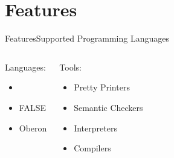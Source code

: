 






\section{Features}

\begin{frame}{Features}{Supported Programming Languages}
\begin{center}
\cpplogo{2em}
\fallogo{2em}
\oblogo{4em}
\end{center}
\begin{columns}[T]
\column{9em}
\begin{block}{Languages:}
\begin{itemize}
\item \cpp{}
\item FALSE
\item Oberon
\end{itemize}
\end{block}
\column{9em}
\begin{block}{Tools:}
\begin{itemize}
\item Pretty Printers
\item Semantic Checkers
\item Interpreters
\item Compilers
\end{itemize}
\end{block}
\end{columns}
\end{frame}

